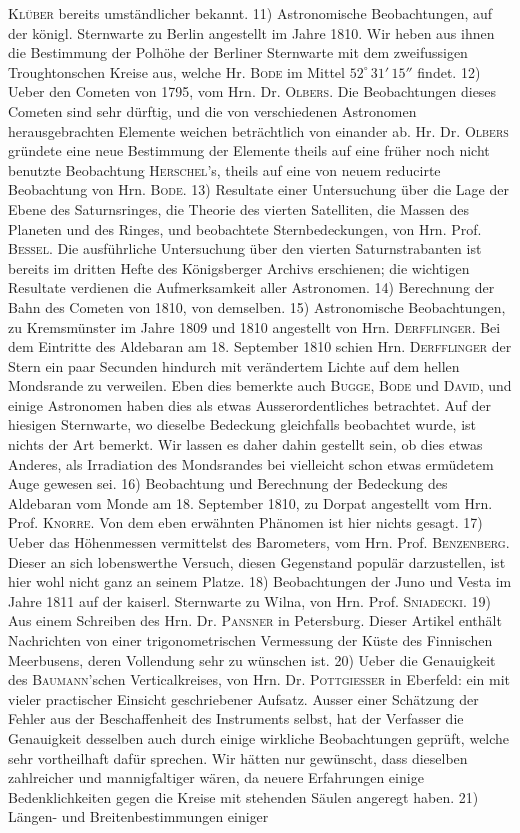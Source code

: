 \textsc{Klüber} bereits umständlicher bekannt. 11) Astronomische Beobachtungen, auf der königl. Sternwarte zu Berlin angestellt im Jahre 1810. Wir heben aus ihnen die Bestimmung der Polhöhe der Berliner Sternwarte mit dem zweifussigen Troughtonschen Kreise aus, welche Hr. \textsc{Bode} im Mittel $52^\circ\,31'\,15''$ findet. 12) Ueber den Cometen von 1795, vom Hrn. Dr. \textsc{Olbers}. Die Beobachtungen dieses Cometen sind sehr dürftig, und die von verschiedenen Astronomen herausgebrachten Elemente weichen beträchtlich von einander ab. Hr. Dr. \textsc{Olbers} gründete eine neue Bestimmung der Elemente theils auf eine früher noch nicht benutzte Beobachtung \textsc{Herschel}'s, theils auf eine von neuem reducirte Beobachtung von Hrn. \textsc{Bode}. 13) Resultate einer Untersuchung über die Lage der Ebene des Saturnsringes, die Theorie des vierten Satelliten, die Massen des Planeten und des Ringes, und beobachtete Sternbedeckungen, von Hrn. Prof. \textsc{Bessel}. Die ausführliche Untersuchung über den vierten Saturnstrabanten ist bereits im dritten Hefte des Königsberger Archivs erschienen; die wichtigen Resultate verdienen die Aufmerksamkeit aller Astronomen. 14) Berechnung der Bahn des Cometen von 1810, von demselben. 15) Astronomische Beobachtungen, zu Kremsmünster im Jahre 1809 und 1810 angestellt von Hrn. \textsc{Derfflinger}. Bei dem Eintritte des Aldebaran am 18. September 1810 schien Hrn. \textsc{Derfflinger} der Stern ein paar Secunden hindurch mit verändertem Lichte auf dem hellen Mondsrande zu verweilen. Eben dies bemerkte auch \textsc{Bugge}, \textsc{Bode} und \textsc{David}, und einige Astronomen haben dies als etwas Ausserordentliches betrachtet. Auf der hiesigen Sternwarte, wo dieselbe Bedeckung gleichfalls beobachtet wurde, ist nichts der Art bemerkt. Wir lassen es daher dahin gestellt sein, ob dies etwas Anderes, als Irradiation des Mondsrandes bei vielleicht schon etwas ermüdetem Auge gewesen sei. 16) Beobachtung und Berechnung der Bedeckung des Aldebaran vom Monde am 18. September 1810, zu Dorpat angestellt vom Hrn. Prof. \textsc{Knorre}. Von dem eben erwähnten Phänomen ist hier nichts gesagt. 17) Ueber das Höhenmessen vermittelst des Barometers, vom Hrn. Prof. \textsc{Benzenberg}. Dieser an sich lobenswerthe Versuch, diesen Gegenstand populär darzustellen, ist hier wohl nicht ganz an seinem Platze. 18) Beobachtungen der Juno und Vesta im Jahre 1811 auf der kaiserl. Sternwarte zu Wilna, von Hrn. Prof. \textsc{Sniadecki}. 19) Aus einem Schreiben des Hrn. Dr. \textsc{Pansner} in Petersburg. Dieser Artikel enthält Nachrichten von einer trigonometrischen Vermessung der Küste des Finnischen Meerbusens, deren Vollendung sehr zu wünschen ist. 20) Ueber die Genauigkeit des \textsc{Baumann}'schen Verticalkreises, von Hrn. Dr. \textsc{Pottgiesser} in Eberfeld: ein mit vieler practischer Einsicht geschriebener Aufsatz. Ausser einer Schätzung der Fehler aus der Beschaffenheit des Instruments selbst, hat der Verfasser die Genauigkeit desselben auch durch einige wirkliche Beobachtungen geprüft, welche sehr vortheilhaft dafür sprechen. Wir hätten nur gewünscht, dass dieselben zahlreicher und mannigfaltiger wären, da neuere Erfahrungen einige Bedenklichkeiten gegen die Kreise mit stehenden Säulen angeregt haben. 21) Längen- und Breitenbestimmungen einiger 